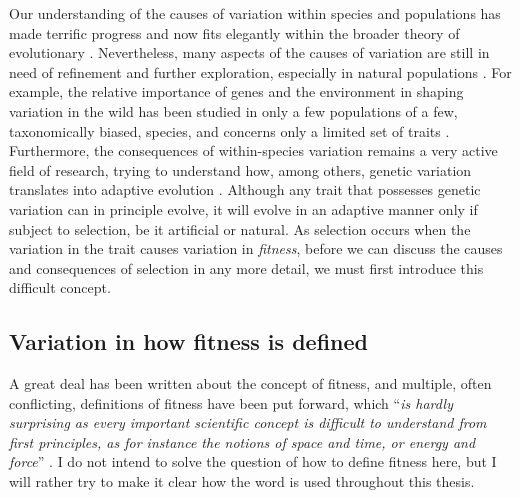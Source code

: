 Our understanding of the causes of variation within species and populations has made terrific progress and now fits elegantly within the broader theory of evolutionary \parencite{Pigliucci2010}. Nevertheless, many aspects of the causes of variation are still in need of refinement and further exploration, especially in natural populations \parencite{Kruuk2014}. For example, the relative importance of genes and the environment in shaping variation in the wild has been studied in only a few populations of a few, taxonomically biased, species, and concerns only a limited set of traits \parencite{Lynch1998, Postma2014}. 
Furthermore, the consequences of within-species variation remains a very active field of research, trying to understand how, among others, genetic variation translates into adaptive evolution \parencite{Brookfield2016}.
Although any trait that possesses genetic variation can in principle evolve, it will evolve in an adaptive manner only if subject to selection, be it artificial or natural. As selection occurs when the variation in the trait causes variation in \emph{fitness}, before we can discuss the causes and consequences of selection in any more detail, we must first introduce this difficult concept.

\subsection{Variation in how fitness is defined}
A great deal has been written about the concept of fitness, and multiple, often conflicting, definitions of fitness have been put forward, which  ``\emph{is hardly surprising as every important scientific concept is difficult to understand from first principles, as for instance the notions of space and time, or energy and force}'' \parencite[p. 1358][]{Wagner2010}. I do not intend to solve the question of how to define fitness here, but I will rather try to make it clear how the word is used throughout this thesis.




